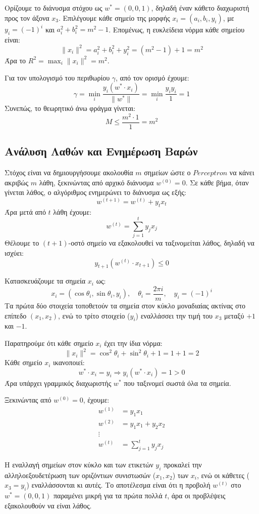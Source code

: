 \documentclass[12pt]{article}
\begin{document}
Ορίζουμε το διάνυσμα στόχου ως $w^* = (0, 0, 1)$, δηλαδή έναν κάθετο διαχωριστή προς τον άξονα $x_3$. Επιλέγουμε κάθε σημείο της μορφής $x_i = (a_i, b_i, y_i)$, με $y_i = (-1)^i$ και $a_i^2 + b_i^2 = m^2 - 1$. Επομένως, η ευκλείδεια νόρμα κάθε σημείου είναι:
\[
\|x_i\|^2 = a_i^2 + b_i^2 + y_i^2 = (m^2 - 1) + 1 = m^2
\]
Άρα το $R^2 = \max_i \|x_i\|^2 = m^2$.

Για τον υπολογισμό του περιθωρίου $\gamma$, από τον ορισμό έχουμε:
\[
\gamma = \min_i \frac{y_i (w^* \cdot x_i)}{\|w^*\|} = \min_i \frac{y_i y_i}{1} = 1
\]
Συνεπώς, το θεωρητικό άνω φράγμα γίνεται:
\[
M \leq \frac{m^2 \cdot 1}{1} = m^2
\]

\subsection*{Ανάλυση Λαθών και Ενημέρωση Βαρών}

Στόχος είναι να δημιουργήσουμε ακολουθία $m$ σημείων ώστε ο $Perceptron$ να κάνει ακριβώς $m$ λάθη, ξεκινώντας από αρχικό διάνυσμα $w^{(0)} = 0$. Σε κάθε βήμα, όταν γίνεται λάθος, ο αλγόριθμος ενημερώνει το διάνυσμα ως εξής:
\[
w^{(t+1)} = w^{(t)} + y_t x_t
\]
Άρα μετά από $t$ λάθη έχουμε:
\[
w^{(t)} = \sum_{j=1}^t y_j x_j
\]
Θέλουμε το $(t+1)$-οστό σημείο να εξακολουθεί να ταξινομείται λάθος, δηλαδή να ισχύει:
\[
y_{t+1} (w^{(t)} \cdot x_{t+1}) \leq 0
\]

Κατασκευάζουμε τα σημεία $x_i$ ως:
\[
x_i = (\cos \theta_i, \sin \theta_i, y_i), \quad \theta_i = \frac{2\pi i}{m}, \quad y_i = (-1)^i
\]
Τα πρώτα δύο στοιχεία τοποθετούν τα σημεία στον κύκλο μοναδιαίας ακτίνας στο επίπεδο $(x_1, x_2)$, ενώ το τρίτο στοιχείο ($y_i$) εναλλάσσει την τιμή του $x_3$ μεταξύ $+1$ και $-1$.

Παρατηρούμε ότι κάθε σημείο $x_i$ έχει την ίδια νόρμα:
\[
\|x_i\|^2 = \cos^2 \theta_i + \sin^2 \theta_i + 1 = 1 + 1 = 2
\]
Κάθε σημείο $x_i$ ικανοποιεί:
\[
w^* \cdot x_i = y_i \Rightarrow y_i (w^* \cdot x_i) = 1 > 0
\]
Άρα υπάρχει γραμμικός διαχωριστής $w^*$ που ταξινομεί σωστά όλα τα σημεία.

Ξεκινώντας από $w^{(0)} = 0$, έχουμε:
\begin{align*}
w^{(1)} &= y_1 x_1 \\
w^{(2)} &= y_1 x_1 + y_2 x_2 \\
\vdots \\
w^{(t)} &= \sum_{j=1}^t y_j x_j
\end{align*}

Η εναλλαγή σημείων στον κύκλο και των ετικετών $y_i$ προκαλεί την αλληλοεξουδετέρωση των οριζόντιων συνιστωσών ($x_1, x_2$) των $x_i$, ενώ οι κάθετες ($x_3 = y_i$) εναλλάσσονται κι αυτές. Το αποτέλεσμα είναι ότι η προβολή $w^{(t)}$ στο $w^* = (0, 0, 1)$ παραμένει μικρή για τα πρώτα πολλά $t$, άρα οι προβλέψεις εξακολουθούν να είναι λάθος.
\end{document}
